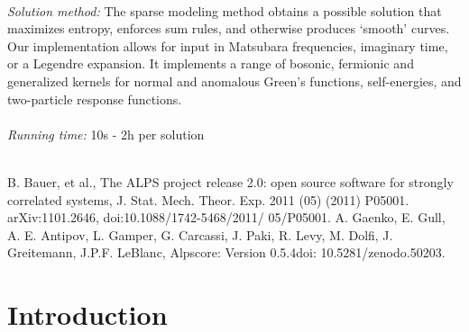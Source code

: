 \documentclass[final,5p,twocolumn,12pt]{elsarticle}
\begin{document}
\begin{small}
   \\
{\em Solution method: }The sparse modeling method obtains a possible solution that maximizes entropy, enforces sum rules, and otherwise produces `smooth' curves.  Our implementation allows for input in Matsubara frequencies, imaginary time, or a Legendre expansion. It implements a range of bosonic, fermionic and generalized kernels for normal and anomalous Green's functions, self-energies, and two-particle response functions.\\
   \\
{\em Running time: }10s - 2h per solution\\
   \\
\begin{thebibliography}{0}
B. Bauer, et al., The ALPS project release 2.0: open source software for strongly correlated systems, J. Stat. Mech. Theor. Exp. 2011 (05) (2011) P05001. arXiv:1101.2646, doi:10.1088/1742-5468/2011/ 05/P05001.
A. Gaenko, E. Gull, A. E. Antipov, L. Gamper, G. Carcassi, J. Paki, R. Levy, M. Dolfi, J. Greitemann, J.P.F. LeBlanc, Alpscore: Version 0.5.4doi: 10.5281/zenodo.50203.
\end{thebibliography}
\end{small}

\section{Introduction}
\label{}













\end{document}
